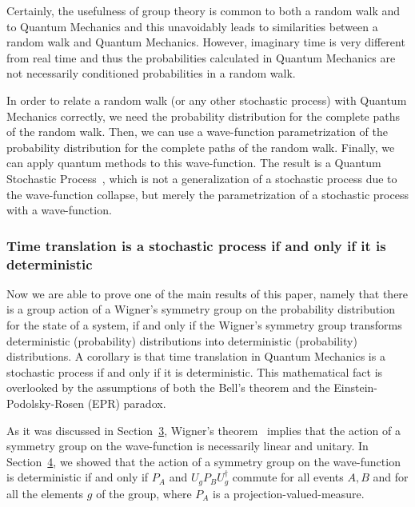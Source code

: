 \documentclass[11pt]{book}
\begin{document}
Certainly, the usefulness of group theory is common to both a random
walk and to Quantum Mechanics and this unavoidably leads to similarities
between a random walk and Quantum Mechanics. However, imaginary time is
very different from real time and thus the probabilities calculated in
Quantum Mechanics are not necessarily conditioned probabilities in a
random walk.

In order to relate a random walk (or any other stochastic process) with
Quantum Mechanics correctly, we need the probability distribution for
the complete paths of the random walk. Then, we can use a wave-function
parametrization of the probability distribution for the complete paths
of the random walk. Finally, we can apply quantum methods to this
wave-function. The result is a Quantum Stochastic
Process~\cite{Parthasarathy2014Quantum}, which is not a generalization of a stochastic process due to the
wave-function collapse, but merely the parametrization of a stochastic
process with a wave-function.

\hypertarget{time-translation-is-a-stochastic-process-if-and-only-if-it-is-deterministic}{%
\subsubsection{Time translation is a stochastic process if and only if
it is
deterministic}\label{time-translation-is-a-stochastic-process-if-and-only-if-it-is-deterministic}}

Now we are able to prove one of the main results of this paper, namely
that there is a group action of a Wigner's symmetry group on the
probability distribution for the state of a system, if and only if the
Wigner's symmetry group transforms deterministic (probability)
distributions into deterministic (probability) distributions. A
corollary is that time translation in Quantum Mechanics is a stochastic
process if and only if it is deterministic. This mathematical fact is
overlooked by the assumptions of both the Bell's theorem and the
Einstein-Podolsky-Rosen (EPR) paradox.

As it was discussed in Section~\protect\hyperlink{sec:symmetries}{3},
Wigner's theorem~\cite{Gehuxe9r2014elementary}\cite{Ruxe4tz1996On}\cite{Molnuxe1r1998algebraic}
implies that the action of a symmetry group on the wave-function is
necessarily linear and unitary. In
Section~\protect\hyperlink{sec:deterministic}{4}, we showed that the
action of a symmetry group on the wave-function is deterministic if and
only if \(P_A\) and \(U_g P_B U^\dagger_g\) commute for all events
\(A,B\) and for all the elements \(g\) of the group, where \(P_A\) is a
projection-valued-measure.
\end{document}
